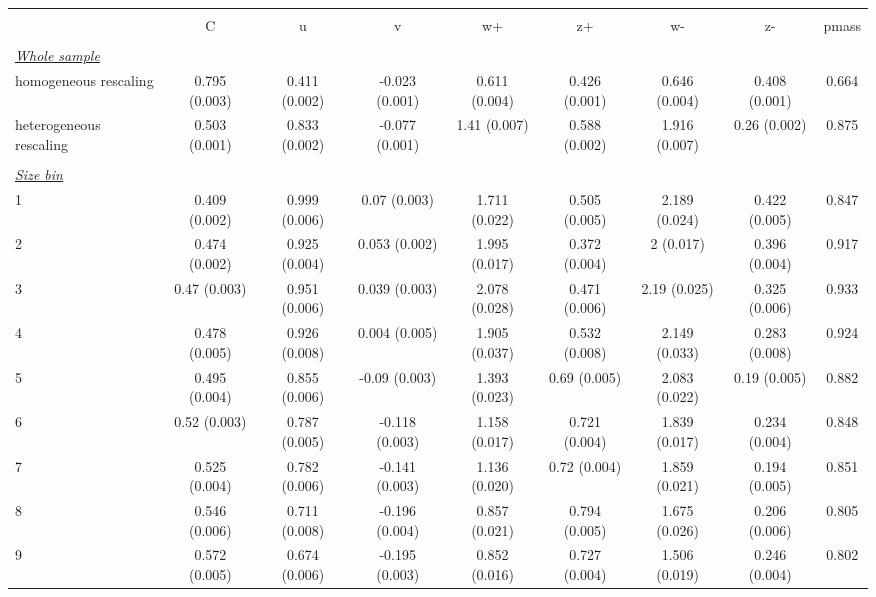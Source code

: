 
\begin{tabular}{@{\extracolsep{5pt}} l cccccccc} 
\\[-1.8ex]\hline 
\hline \\[-1.8ex] 
  & C & u & v & w+ & z+ & w- & z- & pmass \\ 
\hline \\[-1.8ex] 
\underline{{\it Whole sample}} &   &   &   &   &   &   &   &  \\ 
homogeneous rescaling & 0.795 (0.003) & 0.411 (0.002) & -0.023 (0.001) & 0.611 (0.004) & 0.426 (0.001) & 0.646 (0.004) & 0.408 (0.001) & 0.664 \\ 
heterogeneous rescaling & 0.503 (0.001) & 0.833 (0.002) & -0.077 (0.001) & 1.41 (0.007) & 0.588 (0.002) & 1.916 (0.007) & 0.26 (0.002) & 0.875 \\ 
 &   &   &   &   &   &   &   &  \\ 
\underline{{\it Size bin}} &   &   &   &   &   &   &   &  \\ 
1 & 0.409 (0.002) & 0.999 (0.006) & 0.07 (0.003) & 1.711 (0.022) & 0.505 (0.005) & 2.189 (0.024) & 0.422 (0.005) & 0.847 \\ 
2 & 0.474 (0.002) & 0.925 (0.004) & 0.053 (0.002) & 1.995 (0.017) & 0.372 (0.004) & 2 (0.017) & 0.396 (0.004) & 0.917 \\ 
3 & 0.47 (0.003) & 0.951 (0.006) & 0.039 (0.003) & 2.078 (0.028) & 0.471 (0.006) & 2.19 (0.025) & 0.325 (0.006) & 0.933 \\ 
4 & 0.478 (0.005) & 0.926 (0.008) & 0.004 (0.005) & 1.905 (0.037) & 0.532 (0.008) & 2.149 (0.033) & 0.283 (0.008) & 0.924 \\ 
5 & 0.495 (0.004) & 0.855 (0.006) & -0.09 (0.003) & 1.393 (0.023) & 0.69 (0.005) & 2.083 (0.022) & 0.19 (0.005) & 0.882 \\ 
6 & 0.52 (0.003) & 0.787 (0.005) & -0.118 (0.003) & 1.158 (0.017) & 0.721 (0.004) & 1.839 (0.017) & 0.234 (0.004) & 0.848 \\ 
7 & 0.525 (0.004) & 0.782 (0.006) & -0.141 (0.003) & 1.136 (0.020) & 0.72 (0.004) & 1.859 (0.021) & 0.194 (0.005) & 0.851 \\ 
8 & 0.546 (0.006) & 0.711 (0.008) & -0.196 (0.004) & 0.857 (0.021) & 0.794 (0.005) & 1.675 (0.026) & 0.206 (0.006) & 0.805 \\ 
9 & 0.572 (0.005) & 0.674 (0.006) & -0.195 (0.003) & 0.852 (0.016) & 0.727 (0.004) & 1.506 (0.019) & 0.246 (0.004) & 0.802 \\ 

\end{tabular}
